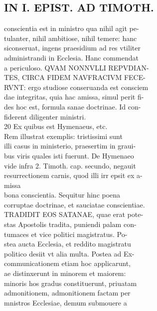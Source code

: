 \documentclass{article}
\begin{document}
\begin{pages}
\section*{IN I. EPIST. AD TIMOTH. \\
                }conscientia est in ministro qua nihil agit pe- \\
                tulanter, nihil ambitiose, nihil temere: hanc \\
                siconseruat, ingens praesidium ad res vtiliter \\
                administrandi in Ecclesia. Hanc commendat \\
                a periculoso. QVAM NONNVLLI REPVDIAN- \\
                TES, CIRCA FIDEM NAVFRACIVM FECE- \\
                RVNT: ergo studiose conseruanda est consciem \\
                dae integritas, quia hac amissa, simul perit fi- \\
                des hoc est, formula sanae doctrinae. Id con- \\
                fiderent diligenter ministri. \\
                20 Ex quibus est Hymenaeus, etc. \\
                Rem illustrat exemplis: tristissimi sunt \\
                illi casus in ministerio, praesertim in graui- \\
                bus viris quales isti fuerunt. De Hymenaeo \\
                vide infra 2. Timoth. cap. secundo, negauit \\
                resurrectionem carnis, quod illi irr epsit ex a- \\
                missa \\
                bona conscientia. Sequitur hinc poena \\
                corruptae doctrinae, et sauciatae conscientiae. \\
                TRADIDIT EOS SATANAE, quae erat pote- \\
                stas Apostolis tradita, puniendi palam con- \\
                tumaces et vice politici magistratus. Po- \\
                stea aucta Ecclesia, et reddito magistratu \\
                politico desiit vt alia multa. Postea ad Ex- \\
                communicationem etiam hoc applicarunt, \\
                ae distinxerunt in minorem et maiorem: \\
                minoris hos gradus constituerunt, priuatam \\
                admonitionem, admonitionem factam per \\
                mnistros Ecclesiae, demum submouere a \\
                

\end{pages}
\end{document}
